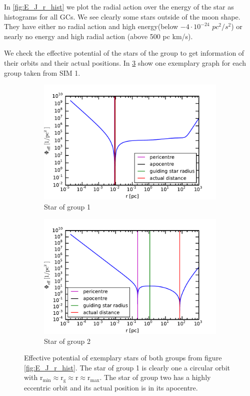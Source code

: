 In \ref{fig:E_J_r_hist} we plot the radial action over the energy of the star as histograms for all \acp{GC}. We see clearly some stars outside of the moon shape. They have either no radial action and high energy(below \(-4 \cdot10^{-24}\) \(pc^2/s^2\)) or nearly no energy and high radial action (above 500 pc km/s). 

\par We check the effective potential of the stars of the group to get information of their orbits and their actual positions. In \ref{fig:eff_pot} show one exemplary graph for each group taken from SIM 1. 

\begin{figure}
\centering
	\begin{subfigure}{0.475\textwidth}
	\centering
	\includegraphics[width=\textwidth]{Plots/pot_eff_group1.pdf}
	\caption{Star of group 1}
	\label{fig:pot_eff_group1}
	\end{subfigure}
	\hfill
	\begin{subfigure}{0.475\textwidth}
	\centering
	\includegraphics[width=\textwidth]{Plots/pot_eff_group2.pdf}
	\caption{Star of group 2}
	\label{fig:pot_eff_group2}
	\end{subfigure}	
\caption{Effective potential of exemplary stars of both groups from figure \ref{fig:E_J_r_hist}. The star of group 1 is clearly one a circular orbit with \(\mathrm{r_{min}\approx r_g\approx r \approx r_{max} }\). The star of group two has a highly eccentric orbit and its actual position is in its apocentre.}
\label{fig:eff_pot}
\end{figure}

